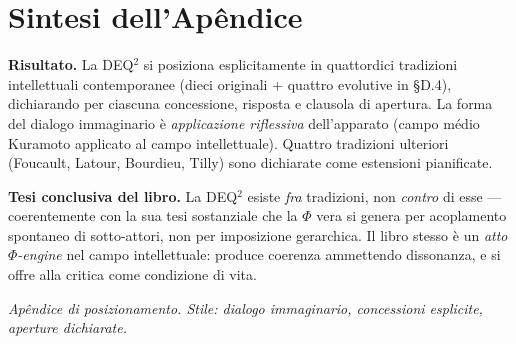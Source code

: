 \section{Sintesi dell'Apêndice}\label{sintesi-dellapêndice}

\Proved{} \textbf{Risultato.} La DEQ$^2$ si posiziona esplicitamente in
quattordici tradizioni intellettuali contemporanee (dieci originali +
quattro evolutive in §D.4), dichiarando per ciascuna concessione, risposta
e clausola di apertura. La forma del dialogo immaginario è
\emph{applicazione riflessiva} dell'apparato (campo médio Kuramoto
applicato al campo intellettuale). Quattro tradizioni ulteriori (Foucault,
Latour, Bourdieu, Tilly) sono dichiarate come estensioni pianificate.

\Hypoth{} \textbf{Tesi conclusiva del libro.} La DEQ$^2$ esiste \emph{fra}
tradizioni, non \emph{contro} di esse --- coerentemente con la sua tesi
sostanziale che la \(\Phi\) vera si genera per acoplamento spontaneo
di sotto-attori, non per imposizione gerarchica. Il libro stesso è un
\emph{atto \(\Phi\)-engine} nel campo intellettuale: produce coerenza
ammettendo dissonanza, e si offre alla critica come condizione di vita.



\emph{Apêndice di posizionamento. Stile: dialogo immaginario,
concessioni esplicite, aperture dichiarate.}
